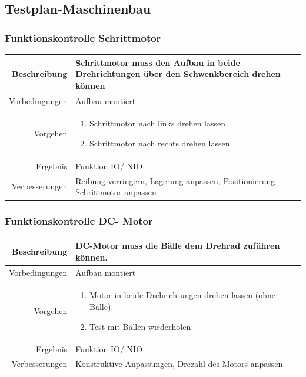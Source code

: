 \newpage
\subsection{Testplan-Maschinenbau}
\subsubsection{Funktionskontrolle Schrittmotor}
\begin{table}[h!]
	\renewcommand{\arraystretch}{1.5}
	\begin{tabular}{|r|p{14cm}|}
		\hline Beschreibung & Schrittmotor muss den Aufbau in beide Drehrichtungen über den Schwenkbereich drehen können  \\ 
		\hline Vorbedingungen & Aufbau montiert \\ 
		\hline Vorgehen & 
		\begin{enumerate}
			\item Schrittmotor nach links drehen lassen 
			\item Schrittmotor nach rechts drehen lassen
		\end{enumerate} \\ 
		\hline Ergebnis & Funktion IO/ NIO \\ 
		\hline Verbesserungen & Reibung verringern, Lagerung anpassen, Positionierung Schrittmotor anpassen \\ 
		\hline 
	\end{tabular}
\end{table}

\subsubsection{Funktionskontrolle DC- Motor}
\begin{table}[h!]
	\renewcommand{\arraystretch}{1.5}
	\begin{tabular}{|r|p{14cm}|}
		\hline Beschreibung & DC-Motor muss die Bälle dem Drehrad zuführen können.  \\ 
		\hline Vorbedingungen & Aufbau montiert \\ 
		\hline Vorgehen & 
		\begin{enumerate}
			\item Motor in beide Drehrichtungen drehen lassen (ohne Bälle). 
			\item Test mit Bällen wiederholen
		\end{enumerate} \\ 
		\hline Ergebnis & Funktion IO/ NIO \\ 
		\hline Verbesserungen & Konstruktive Anpassungen, Drezahl des Motors anpassen \\ 
		\hline 
	\end{tabular}
\end{table}

